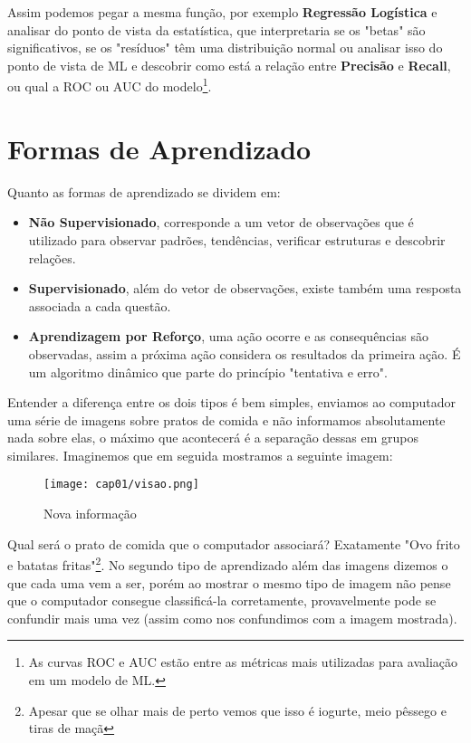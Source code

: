 Assim podemos pegar a mesma função, por exemplo \textbf{Regressão Logística} e analisar do ponto de vista da estatística, que interpretaria se os "betas" são significativos, se os "resíduos" têm uma distribuição normal ou analisar isso do ponto de vista de ML e descobrir como está a relação entre \textbf{Precisão} e \textbf{Recall}, ou qual a ROC ou AUC do modelo\footnote{As curvas ROC e AUC estão entre as métricas mais utilizadas para avaliação em um modelo de ML.}.

\section{Formas de Aprendizado}
Quanto as formas de aprendizado se dividem em:
\begin{itemize}[noitemsep]
	\item \textbf{Não Supervisionado}, corresponde a um vetor de observações que é utilizado para observar padrões, tendências, verificar estruturas e descobrir relações.
	\item \textbf{Supervisionado}, além do vetor de observações, existe também uma resposta associada a cada questão.
	\item \textbf{Aprendizagem por Reforço}, uma ação ocorre e as consequências são observadas, assim a próxima ação considera os resultados da primeira ação. É um algoritmo dinâmico que parte do princípio "tentativa e erro".
\end{itemize}

Entender a diferença entre os dois tipos é bem simples, enviamos ao computador uma série de imagens sobre pratos de comida e não informamos absolutamente nada sobre elas, o máximo que acontecerá é a separação dessas em grupos similares. Imaginemos que em seguida mostramos a seguinte imagem:
\begin{figure}[H]
	\centering\texttt{[image: cap01/visao.png]}
	\caption{Nova informação}
\end{figure}

Qual será o prato de comida que o computador associará? Exatamente "Ovo frito e batatas fritas"\footnote{Apesar que se olhar mais de perto vemos que isso é iogurte, meio pêssego e tiras de maçã}. No segundo tipo de aprendizado além das imagens dizemos o que cada uma vem a ser, porém ao mostrar o mesmo tipo de imagem não pense que o computador consegue classificá-la corretamente, provavelmente pode se confundir mais uma vez (assim como nos confundimos com a imagem mostrada).

